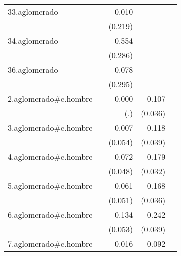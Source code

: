 {\begin{longtable}{l*{4}{D{.}{.}{-1}}}
\addlinespace
33.aglomerado&                     &       0.010         &                     &                     \\
            &                     &     (0.219)         &                     &                     \\
\addlinespace
34.aglomerado&                     &       0.554         &                     &                     \\
            &                     &     (0.286)         &                     &                     \\
\addlinespace
36.aglomerado&                     &      -0.078         &                     &                     \\
            &                     &     (0.295)         &                     &                     \\
\addlinespace
2.aglomerado#c.hombre&                     &       0.000         &       0.107\sym{**} &                     \\
            &                     &         (.)         &     (0.036)         &                     \\
\addlinespace
3.aglomerado#c.hombre&                     &       0.007         &       0.118\sym{**} &                     \\
            &                     &     (0.054)         &     (0.039)         &                     \\
\addlinespace
4.aglomerado#c.hombre&                     &       0.072         &       0.179\sym{***}&                     \\
            &                     &     (0.048)         &     (0.032)         &                     \\
\addlinespace
5.aglomerado#c.hombre&                     &       0.061         &       0.168\sym{***}&                     \\
            &                     &     (0.051)         &     (0.036)         &                     \\
\addlinespace
6.aglomerado#c.hombre&                     &       0.134\sym{*}  &       0.242\sym{***}&                     \\
            &                     &     (0.053)         &     (0.039)         &                     \\
\addlinespace
7.aglomerado#c.hombre&                     &      -0.016         &       0.092\sym{*}  &                     \\

\end{longtable}}
